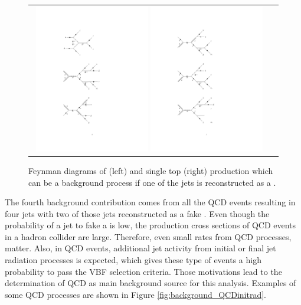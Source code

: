 \begin{figure}[tbh!]
	\centering
	\begin{tabular}{cc}
		\includegraphics[width=0.48\textwidth]{diagrams/pics/background_ttbar.pdf}
		\includegraphics[width=0.48\textwidth]{diagrams/pics/background_singlet.pdf}
	\end{tabular}
	\caption{Feynman diagrams of \ttbar (left) and single top (right) production which can be a background process if one of the jets is reconstructed as a \hadtau.}
	\label{fig:background_ttbar}
\end{figure}

The fourth background contribution comes from all the QCD events resulting in four jets with two of those jets reconstructed as a fake \hadtau. Even though the probability of a jet to fake a \hadtau is low, the production cross sections of QCD events in a hadron collider are large. Therefore, even small \hadtaufake rates from QCD processes, matter. Also, in QCD events, additional jet activity from initial or final jet radiation processes is expected, which gives these type of events a high probability to pass the VBF selection criteria. Those motivations lead to the determination of QCD as main background source for this analysis. Examples of some QCD processes are shown in Figure \ref{fig:background_QCDinitrad}.

